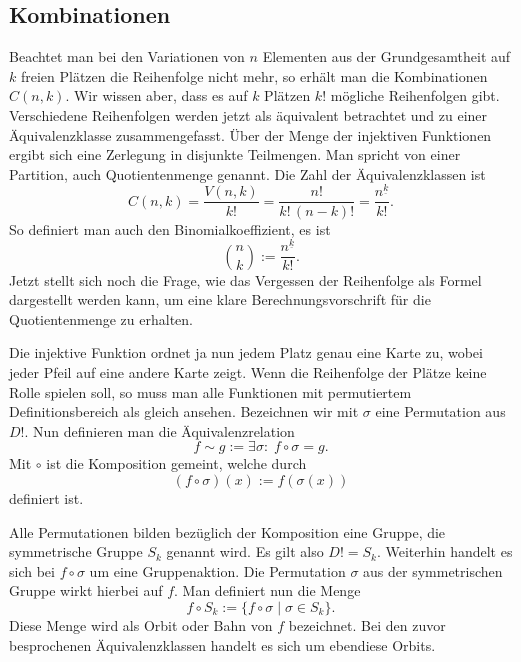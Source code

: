 \documentclass[a4paper,12pt,fleqn]{article}
\begin{document}
\subsection{Kombinationen}
Beachtet man bei den Variationen von $n$ Elementen aus der
Grundgesamtheit auf $k$ freien Plätzen die Reihenfolge nicht mehr,
so erhält man die Kombinationen $C(n,k)$. Wir wissen aber, dass
es auf $k$ Plätzen $k!$ mögliche Reihenfolgen gibt. Verschiedene
Reihenfolgen werden jetzt als äquivalent betrachtet und zu
einer Äquivalenzklasse zusammengefasst. Über der Menge der
injektiven Funktionen ergibt sich eine Zerlegung in disjunkte
Teilmengen. Man spricht von einer Partition, auch Quotientenmenge
genannt. Die Zahl der Äquivalenzklassen ist
\begin{equation}
C(n,k) = \frac{V(n,k)}{k!} = \frac{n!}{k!\,(n-k)!}
= \frac{n^{\underline k}}{k!}.
\end{equation}
So definiert man auch den Binomialkoeffizient, es ist
\begin{equation}
\binom{n}{k} := \frac{n^{\underline k}}{k!}.
\end{equation}
Jetzt stellt sich noch die Frage, wie das Vergessen der Reihenfolge
als Formel dargestellt werden kann, um eine klare
Berechnungsvorschrift für die Quotientenmenge zu erhalten.

Die injektive Funktion ordnet ja nun jedem Platz genau eine Karte
zu, wobei jeder Pfeil auf eine andere Karte zeigt. Wenn die
Reihenfolge der Plätze keine Rolle spielen soll, so muss man
alle Funktionen mit permutiertem Definitionsbereich als gleich
ansehen. Bezeichnen wir mit $\sigma$ eine Permutation
aus $D!$. Nun definieren man die Äquivalenzrelation
\begin{equation}
f\sim g  := \exists \sigma{:}\; f\circ\sigma = g.
\end{equation}
Mit $\circ$ ist die Komposition gemeint, welche durch
\begin{equation}
(f\circ \sigma)(x) := f(\sigma(x))
\end{equation}
definiert ist.

Alle Permutationen bilden bezüglich der Komposition eine Gruppe,
die symmetrische Gruppe $S_k$ genannt wird. Es gilt also
$D!=S_k$. Weiterhin handelt es sich bei $f\circ\sigma$ um eine
Gruppenaktion. Die Permutation $\sigma$ aus der symmetrischen
Gruppe wirkt hierbei auf $f$. Man definiert nun die Menge
\[f\circ S_k := \{f\circ\sigma\;|\;\sigma\in S_k\}.\]
Diese Menge wird als Orbit oder Bahn von $f$ bezeichnet.
Bei den zuvor besprochenen Äquivalenzklassen handelt es sich
um ebendiese Orbits.
\end{document}
